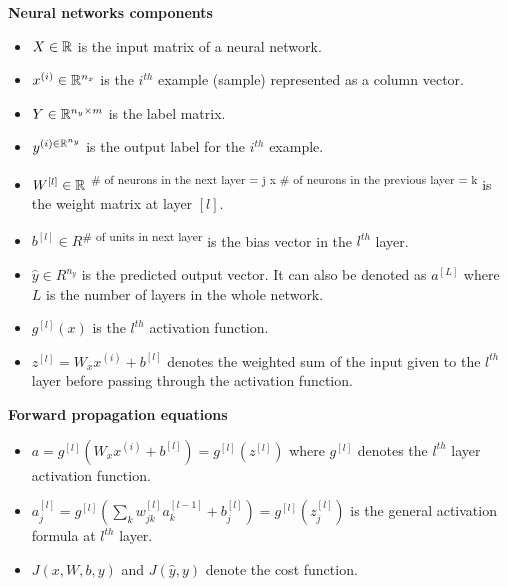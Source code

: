 \noindent \textbf{Neural networks components}
\begin{itemize}
\item $X\in \mathbb{R}$ is the input matrix of a neural network.
\item $x^{(i)} \in \mathbb{R}^{n_{x}}$ is the $i^{th}$ example (sample) represented as a column vector.
\item $Y \in \mathbb{R}^{n_{y} \times m}$ is the label matrix.
\item $y^{(i) \in \mathbb{R}^{n_{y}}}$ is the output label for the $i^{th}$ example.
\item $W^{[l]} \in \mathbb{R}$ \textsuperscript{\# of neurons in the next layer = j  x \# of neurons in the previous layer = k} is the weight matrix at layer $[l]$.
\item $b^{[l]} \in R$\textsuperscript{\# of units in next layer} is the bias vector in the $l^{th}$ layer.
\item $\hat{y} \in R^{n_{y}}$ is the predicted output vector. It can also be denoted as $a^{[L]}$ where $L$ is the number of layers in the whole network.
\item $g^{[l]}(x)$ is the $l^{th}$ activation function.  
\item $z^{[l]} = W_{x}x^{(i)} + b^{[l]}$ denotes the weighted sum of the input given to the $l^{th}$ layer before passing through the activation function.\\
\end{itemize}

\noindent \textbf{Forward propagation equations}
\begin{itemize}
\item $a = g^{[l]}(W_{x}x^{(i)} + b^{[l]}) = g^{[l]}(z^{[l]})$ where $g^{[l]}$ denotes the $l^{th}$ layer activation function.
\item $a_{j}^{[l]} = g^{[l]} (\sum_{k} w_{jk}^{[l]}a_{k}^{[l-1]} + b_{j}^{[l]}) = g^{[l]} (z_{j}^{[l]}) $ is the general activation formula at $l^{th}$ layer.
\item $J(x, W, b, y)$ and $J(\hat{y}, y)$ denote the cost function.
\end{itemize}

